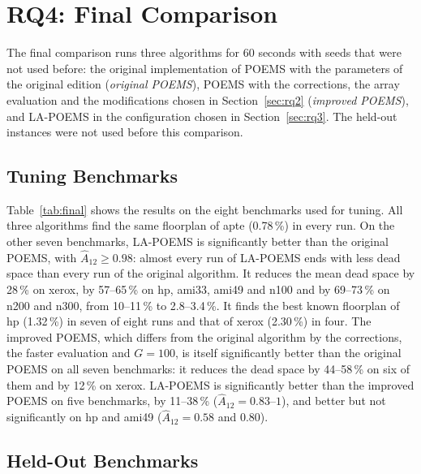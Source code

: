 \section{RQ4: Final Comparison}
\label{sec:rq4}

The final comparison runs three algorithms for 60 seconds with seeds that were not used before: the original implementation of POEMS with the parameters of the original edition ({\em original POEMS}), POEMS with the corrections, the array evaluation and the modifications chosen in Section~\ref{sec:rq2} ({\em improved POEMS}), and LA-POEMS in the configuration chosen in Section~\ref{sec:rq3}. The held-out instances were not used before this comparison.

\subsection{Tuning Benchmarks}

Table~\ref{tab:final} shows the results on the eight benchmarks used for tuning. All three algorithms find the same floorplan of apte (0.78\,\%) in every run. On the other seven benchmarks, LA-POEMS is significantly better than the original POEMS, with $\hat{A}_{12} \geq 0.98$: almost every run of LA-POEMS ends with less dead space than every run of the original algorithm. It reduces the mean dead space by 28\,\% on xerox, by 57--65\,\% on hp, ami33, ami49 and n100 and by 69--73\,\% on n200 and n300, from 10--11\,\% to 2.8--3.4\,\%. It finds the best known floorplan of hp (1.32\,\%) in seven of eight runs and that of xerox (2.30\,\%) in four. The improved POEMS, which differs from the original algorithm by the corrections, the faster evaluation and $G = 100$, is itself significantly better than the original POEMS on all seven benchmarks: it reduces the dead space by 44--58\,\% on six of them and by 12\,\% on xerox. LA-POEMS is significantly better than the improved POEMS on five benchmarks, by 11--38\,\% ($\hat{A}_{12} = 0.83$--$1$), and better but not significantly on hp and ami49 ($\hat{A}_{12} = 0.58$ and 0.80).



\subsection{Held-Out Benchmarks}

